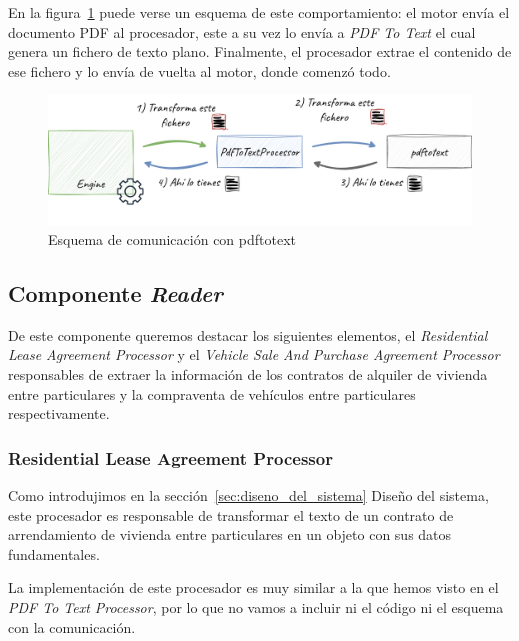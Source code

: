 En la figura~\ref{fig:chapter_4.4.generator_component_pdf_to_text_processor} puede verse un esquema de este
comportamiento: el motor envía el documento PDF al procesador, este a su vez lo envía a \textit{PDF To Text} el cual
genera un fichero de texto plano.
Finalmente, el procesador extrae el contenido de ese fichero y lo envía de vuelta al motor, donde comenzó todo.

\begin{figure}[ht]
    \begin{center}
        \includegraphics[width=\textwidth]{./chapter/4/images/chapter_4.4.generator_component_pdf_to_text_processor}
        \caption{Esquema de comunicación con pdftotext}
        \label{fig:chapter_4.4.generator_component_pdf_to_text_processor}
    \end{center}
\end{figure}

\subsection{Componente \textit{Reader}}

De este componente queremos destacar los siguientes elementos, el \textit{Residential Lease Agreement Processor} y el
\textit{Vehicle Sale And Purchase Agreement Processor} responsables de extraer la información de los contratos de
alquiler de vivienda entre particulares y la compraventa de vehículos entre particulares respectivamente.

\subsubsection{Residential Lease Agreement Processor}

Como introdujimos en la sección~\ref{sec:diseno_del_sistema} Diseño del sistema, este procesador es responsable de
transformar el texto de un contrato de arrendamiento de vivienda entre particulares en un objeto con sus datos
fundamentales.

La implementación de este procesador es muy similar a la que hemos visto en el \textit{PDF To Text Processor}, por lo
que no vamos a incluir ni el código ni el esquema con la comunicación.


